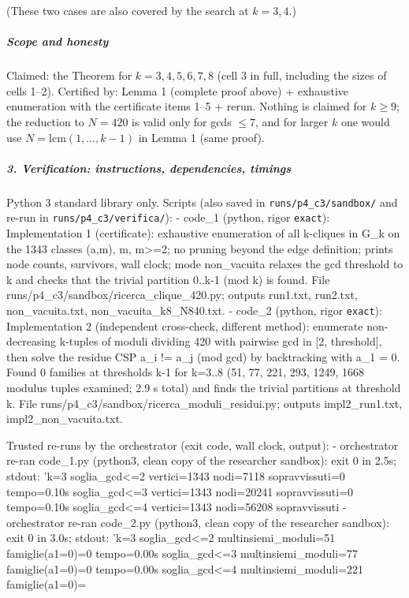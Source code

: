 \documentclass[11pt,a4paper]{article}
\begin{document}
(These two cases are also covered by the search at \(k=3,4\).)

\subparagraph{Scope and honesty}\label{scope-and-honesty}

Claimed: the Theorem for \(k=3,4,5,6,7,8\) (cell 3 in full, including
the sizes of cells 1--2). Certified by: Lemma 1 (complete proof above) +
exhaustive enumeration with the certificate items 1--5 + rerun. Nothing
is claimed for \(k\ge9\); the reduction to \(N=420\) is valid only for
gcds \(\le7\), and for larger \(k\) one would use
\(N=\mathrm{lcm}(1,\dots,k-1)\) in Lemma 1 (same proof).

\subparagraph{3. Verification: instructions, dependencies,
timings}\label{verification-instructions-dependencies-timings}

Python 3 standard library only. Scripts (also saved in
\texttt{runs/p4\_c3/sandbox/} and re-run in
\texttt{runs/p4\_c3/verifica/}): - code\_1 (python, rigor
\texttt{exact}): Implementation 1 (certificate): exhaustive enumeration
of all k-cliques in G\_k on the 1343 classes (a,m), m,
m\textgreater=2; no pruning beyond the edge definition; prints node
counts, survivors, wall clock; mode non\_vacuita relaxes the gcd
threshold to k and checks that the trivial partition 0..k-1 (mod k) is
found. File runs/p4\_c3/sandbox/ricerca\_clique\_420.py; outputs
run1.txt, run2.txt, non\_vacuita.txt, non\_vacuita\_k8\_N840.txt. -
code\_2 (python, rigor \texttt{exact}): Implementation 2 (independent
cross-check, different method): enumerate non-decreasing k-tuples of
moduli dividing 420 with pairwise gcd in {[}2, threshold{]}, then solve
the residue CSP a\_i != a\_j (mod gcd) by backtracking with a\_1 = 0.
Found 0 families at thresholds k-1 for k=3..8 (51, 77, 221, 293, 1249,
1668 modulus tuples examined; 2.9 s total) and finds the trivial
partitions at threshold k. File
runs/p4\_c3/sandbox/ricerca\_moduli\_residui.py; outputs
impl2\_run1.txt, impl2\_non\_vacuita.txt.

Trusted re-runs by the orchestrator (exit code, wall clock, output): -
orchestrator re-ran code\_1.py (python3, clean copy of the researcher
sandbox): exit 0 in 2.5s; stdout: 'k=3 soglia\_gcd\textless=2
vertici=1343 nodi=7118 sopravvissuti=0 tempo=0.10s
soglia\_gcd\textless=3 vertici=1343 nodi=20241 sopravvissuti=0
tempo=0.10s soglia\_gcd\textless=4 vertici=1343 nodi=56208
sopravvissuti - orchestrator re-ran code\_2.py (python3, clean copy of
the researcher sandbox): exit 0 in 3.0s; stdout: 'k=3
soglia\_gcd\textless=2 multinsiemi\_moduli=51 famiglie(a1=0)=0
tempo=0.00s soglia\_gcd\textless=3 multinsiemi\_moduli=77
famiglie(a1=0)=0 tempo=0.00s soglia\_gcd\textless=4
multinsiemi\_moduli=221 famiglie(a1=0)=
\end{document}
